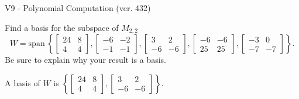 \begin{exercise}
  \begin{exerciseTitle}V9 - Polynomial Computation (ver. 432)\end{exerciseTitle}
  \begin{exerciseStatement}
    Find a basis for the subspace of \(M_{2,2}\) 
\[W=\mathrm{span}\ \left\{\left[\begin{array}{cc}
24 & 8 \\
4 & 4
\end{array}\right] , \left[\begin{array}{cc}
-6 & -2 \\
-1 & -1
\end{array}\right] , \left[\begin{array}{cc}
3 & 2 \\
-6 & -6
\end{array}\right] , \left[\begin{array}{cc}
-6 & -6 \\
25 & 25
\end{array}\right] , \left[\begin{array}{cc}
-3 & 0 \\
-7 & -7
\end{array}\right]\right\}.\]
 Be sure to explain why your result is a basis.


  \end{exerciseStatement}
  \begin{exerciseAnswer}
   A basis of \(W\) is  \(\left\{\left[\begin{array}{cc}
24 & 8 \\
4 & 4
\end{array}\right] , \left[\begin{array}{cc}
3 & 2 \\
-6 & -6
\end{array}\right]\right\}\).
  


  \end{exerciseAnswer}
\end{exercise}